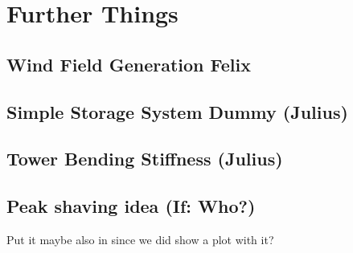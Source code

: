 \chapter{Further Things}
\section{Wind Field Generation Felix}

\section{Simple Storage System Dummy (Julius)}


\section{Tower Bending Stiffness (Julius)}


\section{Peak shaving idea (If: Who?)}
Put it maybe also in since we did show a plot with it?

